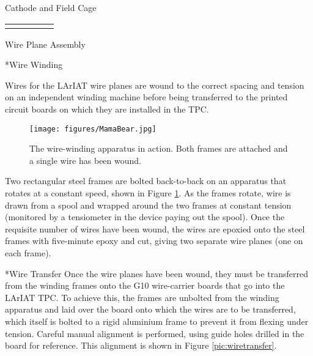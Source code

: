 \begin{subsubsection}{Cathode and Field Cage}
\begin{table}[htpb]
\begin{tabular}{lllll}
                              &                                 &                                 
\end{tabular}
\end{table}

\end{subsubsection}

\begin{subsubsection}{Wire Plane Assembly}\label{sec:WirePlanes}

\begin{subsubsection}*{Wire Winding}

Wires for the LArIAT wire planes are wound to the correct spacing and tension on an independent winding machine before being transferred to the printed circuit boards on which they are installed in the TPC.

\begin{figure}[h!]
\centering
\texttt{[image: figures/MamaBear.jpg]}
\caption{The wire-winding apparatus in action. Both frames are attached and a single wire has been wound.}
\label{pic:mamabear}
\end{figure}

Two rectangular steel frames are bolted back-to-back on an apparatus that rotates at a constant speed, shown in Figure \ref{pic:mamabear}. As the frames rotate, wire is drawn from a spool and wrapped around the two frames at constant tension (monitored by a tensiometer in the device paying out the spool). Once the requisite number of wires have been wound, the wires are epoxied onto the steel frames with five-minute epoxy and cut, giving two separate wire planes (one on each frame).
\end{subsubsection}

\begin{subsubsection}*{Wire Transfer}
Once the wire planes have been wound, they must be transferred from the winding frames onto the G10 wire-carrier boards that go into the LArIAT TPC. To achieve this, the frames are unbolted from the winding apparatus and laid over the board onto which the wires are to be transferred, which itself is bolted to a rigid aluminium frame to prevent it from flexing under tension. Careful manual alignment is performed, using guide holes drilled in the board for reference. This alignment is shown in Figure \ref{pic:wiretransfer}.


\end{subsubsection}
\end{subsubsection}

